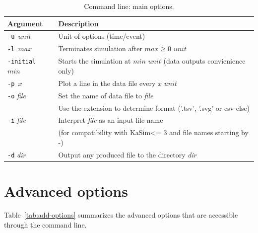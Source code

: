 \documentclass[11pt]{book}
\def\KaSim{\textsf{KaSim}}
\def\ttt#1{\texttt{#1}}
\begin{document}
\begin{table}[h!]
\caption{Command line: main options.}
\centering
\begin{tabular}{|l|l|}
\hline
Argument & Description \\ \hline
\ttt{-u $unit$} & Unit of options (time/event)\\
\ttt{-l $max$} & Terminates simulation after $max \geq 0$ $unit$\\
\ttt{-initial $min$} & Starts the simulation at $min$ $unit$ (data outputs convienience only)\\
\ttt{-p $x$} & Plot a line in the data file every $x$ $unit$\\
\ttt{-o} \textit{file} & Set the name of data file to \textit{file}\\
&Use the extension to determine format ('.tsv', '.svg' or csv else)\\
\ttt{-i} \textit{file} & Interpret \textit{file} as an input file name\\
& (for compatibility with \KaSim <= 3 and file names starting by -)\\
\ttt{-d} \textit{dir} & Output any produced file to the directory \textit{dir}\\
\hline
\end{tabular}
\label{tab:options}
\end{table}%

\section{Advanced options}

Table~\ref{tab:add-options} summarizes the advanced options that are accessible through the command line.
\end{document}
